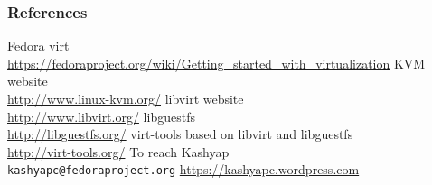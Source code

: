 \documentclass[pdfte x,unicode,minimal,xcolor=table]{beamer}
\begin{document}
\begin{frame}
    \frametitle{References}

    \begin{thebibliography}{MMMMMMMMM}
         Fedora virt \\
        \url{https://fedoraproject.org/wiki/Getting_started_with_virtualization}
         KVM website\\
        \url{http://www.linux-kvm.org/}
         libvirt website \\
        \url{http://www.libvirt.org/}
         libguestfs \\
        \url{http://libguestfs.org/}
         virt-tools based on libvirt and libguestfs \\
        \url{http://virt-tools.org/}
         To reach Kashyap \\
        \texttt{kashyapc@fedoraproject.org}
        \url{https://kashyapc.wordpress.com}
    \end{thebibliography}
\end{frame}
 {
    \Rhbg{\frame{\theend}}
}
\end{document}
